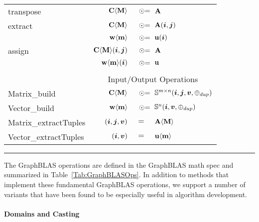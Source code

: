 \begin{table*}[h]
\begin{center}
\begin{tabular}{l|rrl}
{\sf transpose}    & ${\bf C}\langle{\bf M}\rangle$ & $\odotequals$ & ${\bf A}$ \\
{\sf extract}      & ${\bf C}\langle{\bf M}\rangle$ & $\odotequals$ & ${\bf A}(\bm{i},\bm{j})$ \\
                   & ${\bf w}\langle{\bf m}\rangle$ & $\odotequals$ & ${\bf u}(\bm{i})$ \\
{\sf assign}       & ${\bf C}\langle{\bf M}\rangle(\bm{i},\bm{j})$ & $\odotequals$ & ${\bf A}$ \\
                   & ${\bf w}\langle{\bf m}\rangle(\bm{i})$ & $\odotequals$ & ${\bf u}$ \\
& & & \\
& \multicolumn{3}{c}{Input/Output Operations} \\
{\sf Matrix\_build}  & ${\bf C}\langle{\bf M}\rangle$ & $\odotequals$ & $\mathbb{S}^{m\times n}(\bm{i},\bm{j},\bm{v},\oplus_{dup})$ \\
{\sf Vector\_build}  & ${\bf w}\langle{\bf m}\rangle$ & $\odotequals$ & $\mathbb{S}^{n}(\bm{i},\bm{v},\oplus_{dup})$ \\
{\sf Matrix\_extractTuples} & $(\bm{i},\bm{j},\bm{v})$ & $=$ & ${\bf A}\langle{\bf M}\rangle$ \\
{\sf Vector\_extractTuples} & $(\bm{i},\bm{v})$ & $=$ & ${\bf u}\langle{\bf m}\rangle$ \\
\end{tabular}
\end{center}
\hrule
\end{table*}

The GraphBLAS operations are defined in the GraphBLAS math spec and summarized in 
Table~\ref{Tab:GraphBLASOps}.   In addition to methods that implement these
fundamental GraphBLAS operations, we support a number of variants that have been 
found to be especially useful in algorithm development.


%


\paragraph{Domains and Casting}


